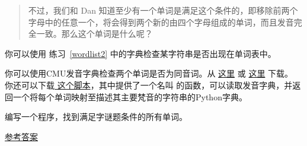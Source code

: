 \begin{exercise}
\begin{quote}
不过，我们和 Dan 知道至少有一个单词是满足这个条件的，即移除前两个字母中的任意一个，将会得到两个新的由四个字母组成的单词，而且发音完全一致。那么这个单词是什么呢？

\end{quote}

  


你可以使用 练习~\ref{wordlist2} 中的字典检查某字符串是否出现在单词表中。


你可以使用CMU发音字典检查两个单词是否为同音词。从 \href{http://www.speech.cs.cmu.edu/cgi-bin/cmudict}{这里} 或 \href{http://thinkpython2.com/code/c06d}{这里} 下载。 你还可以下载\href{http://thinkpython2.com/code/pronounce.py}{ 这个脚本}，其中提供了一个名叫  的函数，可以读取发音字典，并返回一个将每个单词映射至描述其主要梵音的字符串的Python字典。


编写一个程序，找到满足字谜题条件的所有单词。

\href{http://thinkpython2.com/code/homophone.py}{参考答案}

\end{exercise}
